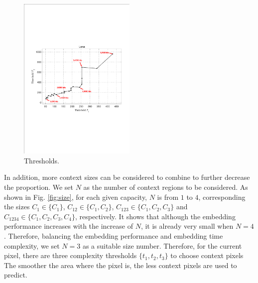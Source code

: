 \documentclass[review,3p,10pt,sort&compress]{elsarticle}
\begin{document}
\begin{figure}
\centering
\includegraphics[width=0.5\textwidth]{figures/Thresholds.pdf}
\centering
\caption{Thresholds.}
\label{Fig.Thresholds}
\end{figure}

In addition, more context sizes can be considered to combine to further decrease the proportion. We set $N$ as the number of context regions to be considered. As shown in Fig. \ref{fig:size}, for each given capacity, $N$ is from $1$ to $4$, corresponding the sizes $C_1 \in \{C_1\}$, $C_{12} \in \{C_1, C_2\}$, $C_{123} \in \{C_1, C_2, C_3\}$ and $C_{1234} \in \{C_1, C_2, C_3, C_4\}$, respectively. It shows that although the embedding performance increases with the increase of $N$, it is already very small when $N = 4$. Therefore, balancing the embedding performance and embedding time complexity, we set $N = 3$ as a suitable size number. Therefore,  for the current pixel, there are three complexity thresholds $\{t_1, t_2, t_3\}$ to choose context pixels The smoother the area where the pixel is, the less context pixels are used to predict.
\end{document}
